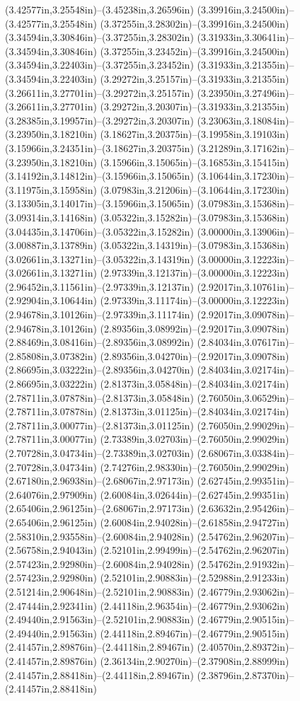 (3.42577in,3.25548in)--(3.45238in,3.26596in) (3.39916in,3.24500in)--(3.42577in,3.25548in) (3.37255in,3.28302in)--(3.39916in,3.24500in) (3.34594in,3.30846in)--(3.37255in,3.28302in) (3.31933in,3.30641in)--(3.34594in,3.30846in) (3.37255in,3.23452in)--(3.39916in,3.24500in) (3.34594in,3.22403in)--(3.37255in,3.23452in) (3.31933in,3.21355in)--(3.34594in,3.22403in) (3.29272in,3.25157in)--(3.31933in,3.21355in) (3.26611in,3.27701in)--(3.29272in,3.25157in) (3.23950in,3.27496in)--(3.26611in,3.27701in) (3.29272in,3.20307in)--(3.31933in,3.21355in) (3.28385in,3.19957in)--(3.29272in,3.20307in) (3.23063in,3.18084in)--(3.23950in,3.18210in) (3.18627in,3.20375in)--(3.19958in,3.19103in) (3.15966in,3.24351in)--(3.18627in,3.20375in) (3.21289in,3.17162in)--(3.23950in,3.18210in) (3.15966in,3.15065in)--(3.16853in,3.15415in) (3.14192in,3.14812in)--(3.15966in,3.15065in) (3.10644in,3.17230in)--(3.11975in,3.15958in) (3.07983in,3.21206in)--(3.10644in,3.17230in) (3.13305in,3.14017in)--(3.15966in,3.15065in) (3.07983in,3.15368in)--(3.09314in,3.14168in) (3.05322in,3.15282in)--(3.07983in,3.15368in) (3.04435in,3.14706in)--(3.05322in,3.15282in) (3.00000in,3.13906in)--(3.00887in,3.13789in) (3.05322in,3.14319in)--(3.07983in,3.15368in) (3.02661in,3.13271in)--(3.05322in,3.14319in) (3.00000in,3.12223in)--(3.02661in,3.13271in) (2.97339in,3.12137in)--(3.00000in,3.12223in) (2.96452in,3.11561in)--(2.97339in,3.12137in) (2.92017in,3.10761in)--(2.92904in,3.10644in) (2.97339in,3.11174in)--(3.00000in,3.12223in) (2.94678in,3.10126in)--(2.97339in,3.11174in) (2.92017in,3.09078in)--(2.94678in,3.10126in) (2.89356in,3.08992in)--(2.92017in,3.09078in) (2.88469in,3.08416in)--(2.89356in,3.08992in) (2.84034in,3.07617in)--(2.85808in,3.07382in) (2.89356in,3.04270in)--(2.92017in,3.09078in) (2.86695in,3.03222in)--(2.89356in,3.04270in) (2.84034in,3.02174in)--(2.86695in,3.03222in) (2.81373in,3.05848in)--(2.84034in,3.02174in) (2.78711in,3.07878in)--(2.81373in,3.05848in) (2.76050in,3.06529in)--(2.78711in,3.07878in) (2.81373in,3.01125in)--(2.84034in,3.02174in) (2.78711in,3.00077in)--(2.81373in,3.01125in) (2.76050in,2.99029in)--(2.78711in,3.00077in) (2.73389in,3.02703in)--(2.76050in,2.99029in) (2.70728in,3.04734in)--(2.73389in,3.02703in) (2.68067in,3.03384in)--(2.70728in,3.04734in) (2.74276in,2.98330in)--(2.76050in,2.99029in) (2.67180in,2.96938in)--(2.68067in,2.97173in) (2.62745in,2.99351in)--(2.64076in,2.97909in) (2.60084in,3.02644in)--(2.62745in,2.99351in) (2.65406in,2.96125in)--(2.68067in,2.97173in) (2.63632in,2.95426in)--(2.65406in,2.96125in) (2.60084in,2.94028in)--(2.61858in,2.94727in) (2.58310in,2.93558in)--(2.60084in,2.94028in) (2.54762in,2.96207in)--(2.56758in,2.94043in) (2.52101in,2.99499in)--(2.54762in,2.96207in) (2.57423in,2.92980in)--(2.60084in,2.94028in) (2.54762in,2.91932in)--(2.57423in,2.92980in) (2.52101in,2.90883in)--(2.52988in,2.91233in) (2.51214in,2.90648in)--(2.52101in,2.90883in) (2.46779in,2.93062in)--(2.47444in,2.92341in) (2.44118in,2.96354in)--(2.46779in,2.93062in) (2.49440in,2.91563in)--(2.52101in,2.90883in) (2.46779in,2.90515in)--(2.49440in,2.91563in) (2.44118in,2.89467in)--(2.46779in,2.90515in) (2.41457in,2.89876in)--(2.44118in,2.89467in) (2.40570in,2.89372in)--(2.41457in,2.89876in) (2.36134in,2.90270in)--(2.37908in,2.88999in) (2.41457in,2.88418in)--(2.44118in,2.89467in) (2.38796in,2.87370in)--(2.41457in,2.88418in) 
